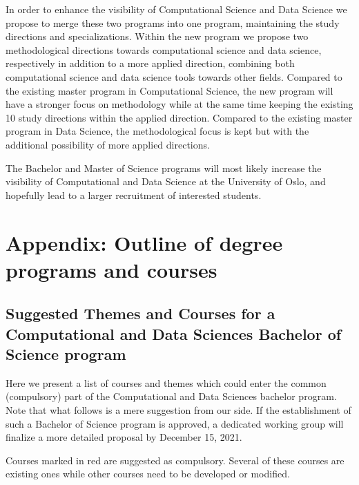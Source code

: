 \documentclass[oneside,final,10pt]{article}
\begin{document}
In order to enhance the visibility of Computational Science and Data Science we propose to merge these two programs into one program, maintaining the study directions and specializations. Within the new program we propose two methodological directions towards computational science and data science, respectively in addition to a more applied direction, combining both computational science and data science tools towards other fields. Compared to the existing master program in Computational Science, the new program will have a stronger focus on methodology while at the same time keeping the existing 10 study directions within the applied direction. Compared to the existing master program in Data Science, the methodological focus is kept but with the additional possibility of more applied directions.

The Bachelor and Master of Science programs
will most likely increase the visibility of Computational and Data Science at the University of Oslo, and hopefully lead to a larger recruitment of interested students. 










\section*{Appendix:  Outline of degree programs and courses}

\subsection*{Suggested Themes and Courses for a Computational and Data Sciences  Bachelor of Science program}

Here we present a list of courses and themes which could enter the common (compulsory) part of the Computational and Data Sciences  bachelor program.  Note that what follows is a mere suggestion from our side. If the establishment of such a Bachelor of Science program is approved, a dedicated working group will finalize a more detailed proposal by December 15, 2021.

Courses marked in red are suggested as compulsory.
Several of these courses are existing ones while other courses need to be developed or modified. 
\end{document}
